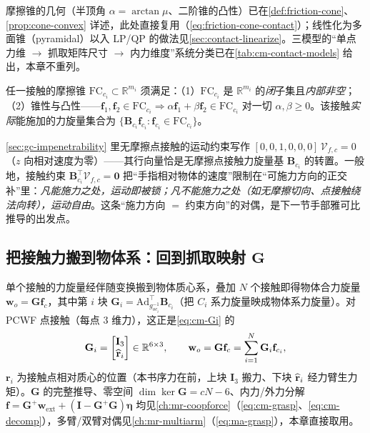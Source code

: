 \noindent 摩擦锥的几何（半顶角 $\alpha=\arctan\mu$、二阶锥的凸性）已在\cref{def:friction-cone}、\cref{prop:cone-convex} 详述，此处直接复用（\cref{eq:friction-cone-contact}）；线性化为多面锥（pyramidal）以入 LP/QP 的做法见\cref{sec:contact-linearize}。三模型的“单点力维 $\to$ 抓取矩阵尺寸 $\to$ 内力维度”系统分类已在\cref{tab:cm-contact-models} 给出，本章不重列。

\begin{definition}[摩擦锥须满足的凸锥公理]
\label{def:gc-fc-axioms}
任一接触的摩擦锥 $\mathrm{FC}_{c_i}\subset\mathbb{R}^{m_i}$ 须满足：（1）$\mathrm{FC}_{c_i}$ 是 $\mathbb{R}^{m_i}$ 的\emph{闭}子集且\emph{内部非空}；（2）锥性与凸性——$\mathbf{f}_1,\mathbf{f}_2\in\mathrm{FC}_{c_i}\Rightarrow\alpha\mathbf{f}_1+\beta\mathbf{f}_2\in\mathrm{FC}_{c_i}$ 对一切 $\alpha,\beta\ge0$。该接触\emph{实际}能施加的力旋量集合为 $\{\mathbf{B}_{c_i}\mathbf{f}_{c_i}:\mathbf{f}_{c_i}\in\mathrm{FC}_{c_i}\}$。
\end{definition}

\begin{note}
\cref{sec:gc-impenetrability} 里无摩擦点接触的运动约束写作 $[0,0,1,0,0,0]\,\mathcal{V}_{f,c}=0$（$z$ 向相对速度为零）——其行向量恰是无摩擦点接触力旋量基 $\mathbf{B}_{c_i}$ 的转置。一般地，接触约束 $\mathbf{B}_{c_i}^\top\mathcal{V}_{f,c}=\mathbf{0}$ 把“手指相对物体的速度”限制在“可施力方向的正交补”里：\emph{凡能施力之处，运动即被锁；凡不能施力之处（如无摩擦切向、点接触绕法向转），运动自由}。这条“施力方向 $=$ 约束方向”的对偶，是下一节手部雅可比推导的出发点。
\end{note}

\subsection{把接触力搬到物体系：回到抓取映射 \texorpdfstring{$\mathbf{G}$}{G}}
\label{sec:gc-graspmap-recall}

单个接触的力旋量经伴随变换搬到物体质心系，叠加 $N$ 个接触即得物体合力旋量 $\mathbf{w}_o=\mathbf{G}\mathbf{f}_c$，其中第 $i$ 块 $\mathbf{G}_i=\mathrm{Ad}_{g_{oc_i}^{-1}}^\top\mathbf{B}_{c_i}$（把 $C_i$ 系力旋量映成物体系力旋量）。对 PCWF 点接触（每点 $3$ 维力），这正是\cref{eq:cm-Gi} 的
\begin{equation}
  \mathbf{G}_i=\begin{bmatrix}\mathbf{I}_3\\ \widehat{\mathbf{r}}_i\end{bmatrix}\in\mathbb{R}^{6\times3},
  \qquad \mathbf{w}_o=\mathbf{G}\mathbf{f}_c=\sum_{i=1}^N\mathbf{G}_i\mathbf{f}_{c_i},
  \label{eq:gc-graspmap}
\end{equation}
$\mathbf{r}_i$ 为接触点相对质心的位置（本书序力在前，上块 $\mathbf{I}_3$ 搬力、下块 $\widehat{\mathbf{r}}_i$ 经力臂生力矩）。$\mathbf{G}$ 的完整推导、零空间 $\dim\ker\mathbf{G}=cN-6$、内力/外力分解 $\mathbf{f}=\mathbf{G}^+\mathbf{w}_{\text{ext}}+(\mathbf{I}-\mathbf{G}^+\mathbf{G})\boldsymbol{\eta}$ 均见\cref{ch:mr-coopforce}（\cref{eq:cm-grasp}、\cref{eq:cm-decomp}），多臂/双臂对偶见\cref{ch:mr-multiarm}（\cref{eq:ma-grasp}），本章直接取用。

